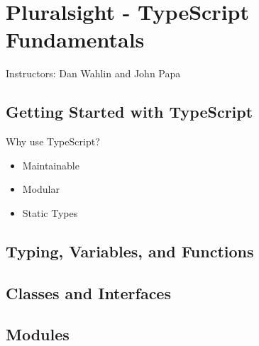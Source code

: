 \chapter{Pluralsight - TypeScript Fundamentals}

Instructors: Dan Wahlin and John Papa

\section{Getting Started with TypeScript}

Why use TypeScript? 
\begin{itemize}
  \item Maintainable
  \item Modular
  \item Static Types
\end{itemize}
\section{Typing, Variables, and Functions}
\section{Classes and Interfaces}
\section{Modules}
